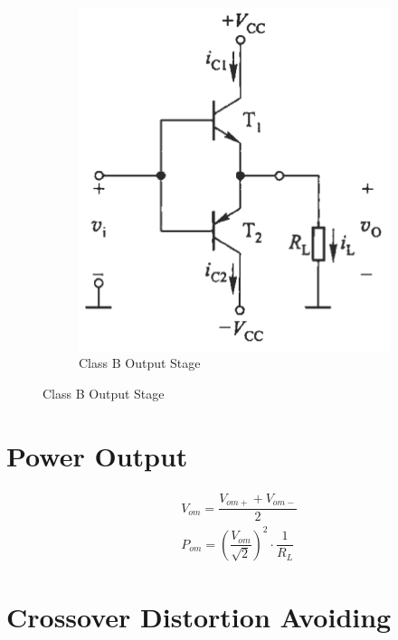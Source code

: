 \begin{figure}[H]
\begin{subfigure}{.4\textwidth}
    \includegraphics[width=\linewidth]{figures/Power-B-Ex}
    \caption{Class B Output Stage}
  \end{subfigure}
\end{figure}

\section{Power Output}

\begin{equation*}
  \begin{aligned}
    & V_{om} = \dfrac{V_{om+} + V_{om-}}{2} \\
    & P_{om} = \left( \dfrac{V_{om}}{\sqrt{2}}  \right)^2 \cdot \dfrac{1}{R_L}  
  \end{aligned}
\end{equation*}

\section{Crossover Distortion Avoiding}

